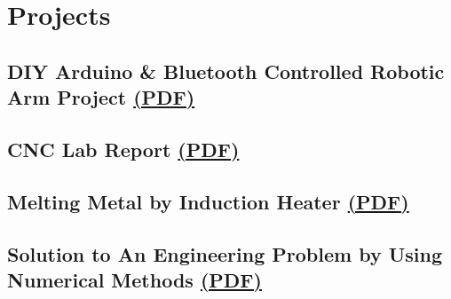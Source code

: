 \section*{Projects}
%
%
%
%
%
%
\subsection*{
  DIY Arduino \& Bluetooth Controlled Robotic Arm Project
  \subsubsectionstyle
  \href{https://drive.google.com/file/d/1gmzZdRsunAH3hOsSkZU2sLoMINN6RA6X/view}{(PDF)}
}
%
%
%
%
\subsection*{
  CNC Lab Report
  \subsubsectionstyle
  \href{https://drive.google.com/file/d/1sxRlZ2ThcNY0KjlmiwgLPds5Xsv2L8yJ/view?}{(PDF)}
}
%
%
%
%
\subsection*{
  Melting Metal by Induction Heater
  \subsubsectionstyle
  \href{https://drive.google.com/file/d/1ay_cD3jObiWNZwhEC6sC6dirg7XZCQKf/view}{(PDF)}
}
%
%
%
%
\subsection*{
  Solution to An Engineering Problem by Using Numerical Methods
  \subsubsectionstyle
  \href{https://drive.google.com/file/d/1xsy6VxLKrDIkHc15VYZ0rD9TY_8eDnR3/view}{(PDF)}
}